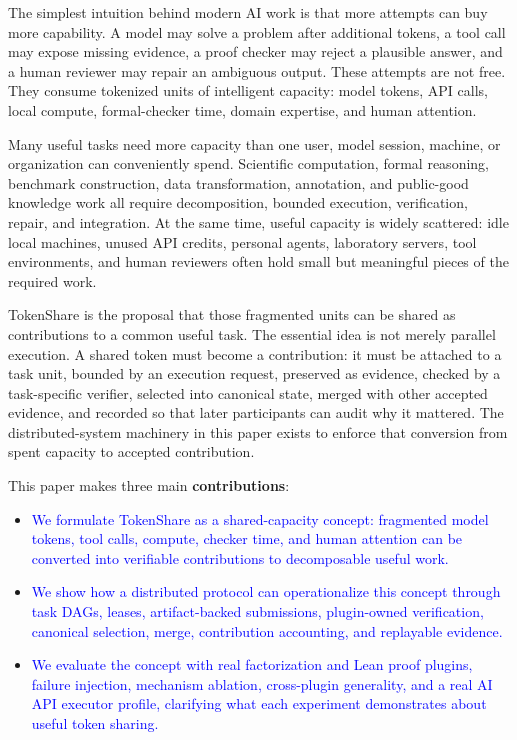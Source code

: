 \documentclass{article}
\theoremstyle{plain}
\begin{document}
{\color{blue}
The simplest intuition behind modern AI work is that more attempts can buy more capability. A model may solve a problem after additional tokens, a tool call may expose missing evidence, a proof checker may reject a plausible answer, and a human reviewer may repair an ambiguous output. These attempts are not free. They consume tokenized units of intelligent capacity: model tokens, API calls, local compute, formal-checker time, domain expertise, and human attention.

Many useful tasks need more capacity than one user, model session, machine, or organization can conveniently spend. Scientific computation, formal reasoning, benchmark construction, data transformation, annotation, and public-good knowledge work all require decomposition, bounded execution, verification, repair, and integration. At the same time, useful capacity is widely scattered: idle local machines, unused API credits, personal agents, laboratory servers, tool environments, and human reviewers often hold small but meaningful pieces of the required work.

TokenShare is the proposal that those fragmented units can be shared as contributions to a common useful task. The essential idea is not merely parallel execution. A shared token must become a contribution: it must be attached to a task unit, bounded by an execution request, preserved as evidence, checked by a task-specific verifier, selected into canonical state, merged with other accepted evidence, and recorded so that later participants can audit why it mattered. The distributed-system machinery in this paper exists to enforce that conversion from spent capacity to accepted contribution.
}

This paper makes three main \textbf{contributions}:

\begin{itemize}
\item \textcolor{blue}{We formulate TokenShare as a shared-capacity concept: fragmented model tokens, tool calls, compute, checker time, and human attention can be converted into verifiable contributions to decomposable useful work.}
 \item \textcolor{blue}{We show how a distributed protocol can operationalize this concept through task DAGs, leases, artifact-backed submissions, plugin-owned verification, canonical selection, merge, contribution accounting, and replayable evidence.}
\item  \textcolor{blue}{We evaluate the concept with real factorization and Lean proof plugins, failure injection, mechanism ablation, cross-plugin generality, and a real AI API executor profile, clarifying what each experiment demonstrates about useful token sharing.}
\end{itemize}
\end{document}
